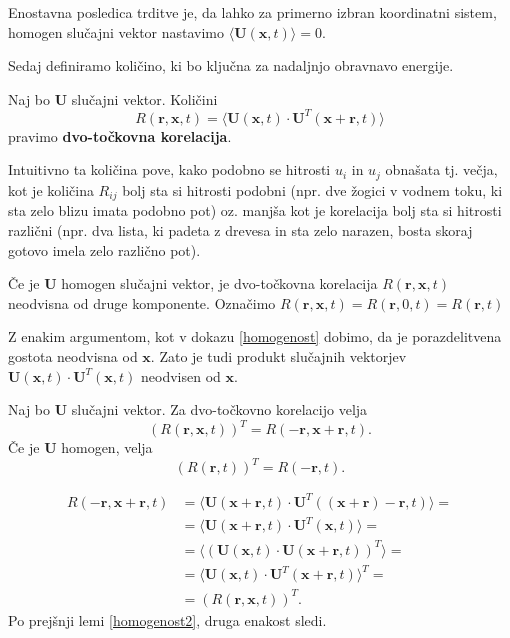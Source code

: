 \documentclass[mat2, tisk]{fmfdelo}
\newcommand{\bd}{\textbf}
\begin{document}
\noindent
Enostavna posledica trditve je, da lahko za primerno izbran koordinatni sistem,
homogen slučajni vektor nastavimo $\langle \bd{U}(\bd{x}, t) \rangle = 0$.

Sedaj definiramo količino, ki bo ključna za nadaljnjo obravnavo 
energije.

\begin{definicija}
Naj bo $\bd{U}$ slučajni vektor. Količini 
\begin{equation}
R(\bd{r}, \bd{x}, t) = \langle \bd{U}(\bd{x}, t)\cdot \bd{U}^T(\bd{x} + \bd{r}, t)\rangle
\end{equation}
pravimo \textbf{dvo-točkovna korelacija}.
\end{definicija}

Intuitivno ta količina pove, kako podobno se hitrosti $u_i$ in 
$u_j$ obnašata tj. večja, kot je količina $R_{ij}$ bolj sta si hitrosti 
podobni (npr. dve žogici v vodnem toku, ki sta zelo blizu imata podobno pot) oz. 
manjša kot je korelacija bolj sta si hitrosti različni (npr. dva lista, ki padeta 
z drevesa in sta zelo narazen, bosta skoraj gotovo imela zelo različno pot).

\begin{lema}
\label{homogenost2}
Če je $\bd{U}$ homogen slučajni vektor, je
dvo-točkovna korelacija $R(\bd{r}, \bd{x}, t)$ neodvisna od druge komponente.
Označimo $R(\bd{r}, \bd{x}, t) = R(\bd{r}, 0, t) = R(\bd{r}, t)$
\end{lema}

\begin{dokaz}
Z enakim argumentom, kot v dokazu \ref{homogenost} dobimo, da je 
porazdelitvena gostota neodvisna od $\bd{x}$. Zato je tudi produkt 
slučajnih vektorjev $\bd{U}(\bd{x}, t)\cdot \bd{U}^T(\bd{x}, t)$ neodvisen 
od $\bd{x}$.
\end{dokaz}

\begin{lema}
\label{dvo_točkovna_korelacija}
Naj bo $\bd{U}$ slučajni vektor. Za dvo-točkovno korelacijo velja 
\begin{equation}
(R(\bd{r}, \bd{x}, t))^T = R(-\bd{r}, \bd{x} + \bd{r}, t). 
\end{equation}
Če je $\bd{U}$ homogen, velja 
\begin{equation}
(R(\bd{r}, t))^T = R(-\bd{r}, t). 
\end{equation}
\end{lema}

\begin{dokaz}
\begin{align*}
  R(-\bd{r}, \bd{x} + \bd{r}, t) &= \langle \bd{U}(\bd{x} + \bd{r}, t)\cdot \bd{U}^T((\bd{x} + \bd{r}) - \bd{r}, t)\rangle = \\
  &= \langle \bd{U}(\bd{x} + \bd{r}, t)\cdot \bd{U}^T(\bd{x}, t)\rangle = \\
  &= \langle(\bd{U}(\bd{x}, t)\cdot \bd{U}(\bd{x} + \bd{r}, t))^T\rangle =\\
  &= \langle \bd{U}(\bd{x}, t)\cdot \bd{U}^T(\bd{x} + \bd{r}, t)\rangle^T =\\
  &= (R(\bd{r}, \bd{x}, t))^T.
\end{align*}  
Po prejšnji lemi \ref{homogenost2}, druga enakost sledi.
\end{dokaz}
\end{document}
